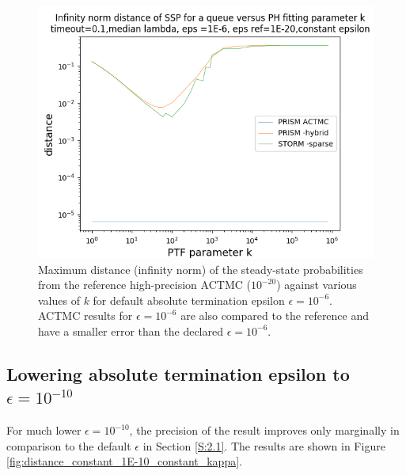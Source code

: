 \documentclass[paper=a4, fontsize=11pt]{scrartcl}
\numberwithin{equation}{section}		%
\numberwithin{figure}{section}			%
\numberwithin{table}{section}				%
\begin{document}
	\begin{figure}[H]
		\begin{center}
			\includegraphics[trim=0.3cm 0cm 0cm 1.35cm,width=15cm, clip]{picture/New_model/1E-6/distance_constant_1E-6.png}
		\end{center}
		\caption{Maximum distance (infinity norm) of the steady-state probabilities from the reference high-precision ACTMC ($10^{-20}$) against various values of $k$ for default absolute termination epsilon $\epsilon = 10^{-6}$. ACTMC results for $\epsilon = 10^{-6}$ are also compared to the reference and have a smaller error than the declared $\epsilon = 10^{-6}$.}
		\label{fig:distance_constant_standard_constant_kappa}
	\end{figure}
	
	\pagebreak
	\subsection{Lowering absolute termination epsilon to $\epsilon = 10^{-10}$}
	\label{S:2.2}
	
	For much lower $\epsilon = 10^{-10}$, the precision of the result improves only marginally in comparison to the default $\epsilon$ in Section \ref{S:2.1}. The results are shown in Figure \ref{fig:distance_constant_1E-10_constant_kappa}.
	
\end{document}

